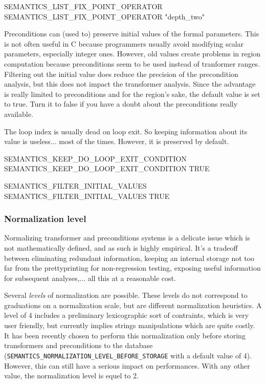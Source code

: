 \documentclass[a4paper]{report}
\begin{document}
\begin{PipsProp}{SEMANTICS_LIST_FIX_POINT_OPERATOR}
SEMANTICS_LIST_FIX_POINT_OPERATOR "depth_two"
\end{PipsProp}

Preconditions can (used to) preserve initial values of the formal
parameters. This is not often useful in C because programmers usually
avoid modifying scalar parameters, especially integer ones. However,
old values create problems in region computation because preconditions
seem to be used instead of tranformer ranges. Filtering out the
initial value does reduce the precision of the precondition analysis,
but this does not impact the transformer analysis. Since the advantage
is really limited to preconditions and for the region's sake, the
default value is set to true. Turn it to false if you have a doubt
about the preconditions really available.

The loop index is usually dead on loop exit. So keeping information
about its value is useless... most of the times. However, it is
preserved by default.

\begin{PipsProp}{SEMANTICS_KEEP_DO_LOOP_EXIT_CONDITION}
SEMANTICS_KEEP_DO_LOOP_EXIT_CONDITION TRUE
\end{PipsProp}

\begin{PipsProp}{SEMANTICS_FILTER_INITIAL_VALUES}
SEMANTICS_FILTER_INITIAL_VALUES TRUE
\end{PipsProp}

\subsubsection{Normalization level}

Normalizing transformer and preconditions systems is a delicate issue
which is not mathematically defined, and as such is highly
empirical. It's a tradeoff between eliminating redundant information,
keeping an internal storage not too far from the prettyprinting for
non-regression testing, exposing useful information for subsequent
analyses,... all this at a reasonable cost.

Several \emph{levels} of normalization are possible. These levels do
not correspond to graduations on a normalization scale, but are
different normalization heuristics. A level of 4 includes a
preliminary lexicographic sort of contraints, which is very user
friendly, but currently implies strings manipulations which are quite
costly. It has been recently chosen to perform this normalization only
before storing transformers and preconditions to the database
(\texttt{SEMANTICS\_NORMALIZATION\_LEVEL\_BEFORE\_STORAGE} with a
default value of 4). However, this can still have a serious impact on
performances. With any other value, the normalization level is equel to 2.
\end{document}
